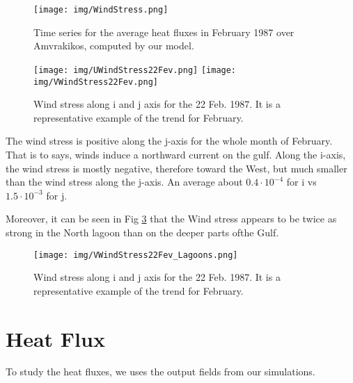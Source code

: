 \documentclass[english]{PFeENSTA}
\begin{document}
{\begin{figure}[H]
   \begin{minipage}[h!]{1\linewidth}
   \centering
   \texttt{[image: img/WindStress.png]}
   \end{minipage}
  \caption{\label{fig:Heat Flux}Time series for the average heat fluxes in February 1987 over Amvrakikos, computed by our model.}
\end{figure}


\begin{figure}[H]
   \begin{minipage}[h!]{1\linewidth}
   \centering
   \texttt{[image: img/UWindStress22Fev.png]}
    \texttt{[image: img/VWindStress22Fev.png]}
   \end{minipage}
  \caption{\label{fig:UV_WindStress} Wind stress along i and j axis for the 22 Feb. 1987. It is a representative example of the trend for February.}
\end{figure}

The wind stress is positive along the j-axis for the whole month of February. That is to says, winds induce a northward current on the gulf. 
Along the i-axis, the wind stress is mostly negative, therefore toward the West, but much smaller than the wind stress along the j-axis. An average about $0.4\cdot 10^{-4}$ for i vs $1.5\cdot 10^{-3}$ for j.

Moreover, it can be seen in Fig \ref{fig:V_WindStress_Lagoons} that the Wind stress appears to be twice as strong in the North lagoon than on the deeper parts ofthe Gulf.

\begin{figure}[H]
   \begin{minipage}[h!]{1\linewidth}
   \centering
    \texttt{[image: img/VWindStress22Fev\_Lagoons.png]}
   \end{minipage}
  \caption{\label{fig:V_WindStress_Lagoons} Wind stress along i and j axis for the 22 Feb. 1987. It is a representative example of the trend for February.}
\end{figure}


\section{Heat Flux}
%
%

To study the heat fluxes, we uses the output fields from our simulations. 



}
\end{document}
